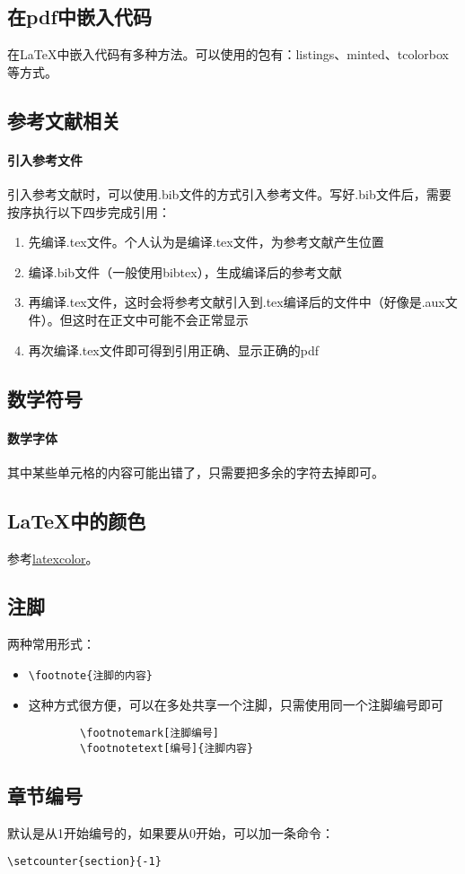 \subsection{在pdf中嵌入代码}在\LaTeX 中嵌入代码有多种方法。可以使用的包有：listings、minted、tcolorbox等方式。

\subsection{参考文献相关}
\paragraph{引入参考文件}引入参考文献时，可以使用.bib文件的方式引入参考文件。写好.bib文件后，需要按序执行以下四步完成引用：
\begin{enumerate}
	\item 先编译.tex文件。个人认为是编译.tex文件，为参考文献产生位置
	\item 编译.bib文件（一般使用bibtex），生成编译后的参考文献
	\item 再编译.tex文件，这时会将参考文献引入到.tex编译后的文件中（好像是.aux文件）。但这时在正文中可能不会正常显示
	\item 再次编译.tex文件即可得到引用正确、显示正确的pdf
\end{enumerate}

\subsection{数学符号}
\paragraph{数学字体}其中某些单元格的内容可能出错了，只需要把多余的字符去掉即可。


\subsection{\LaTeX 中的颜色}
参考\href{http://latexcolor.com/}{latexcolor}。

\subsection{注脚}
两种常用形式：
\begin{itemize}
	\item \begin{verbatim}\footnote{注脚的内容}\end{verbatim}
	\item 这种方式很方便，可以在多处共享一个注脚，只需使用同一个注脚编号即可
	\begin{verbatim}
		\footnotemark[注脚编号]
		\footnotetext[编号]{注脚内容}
	\end{verbatim}
\end{itemize}

\subsection{章节编号}
默认是从1开始编号的，如果要从0开始，可以加一条命令：\begin{verbatim}\setcounter{section}{-1}\end{verbatim}








